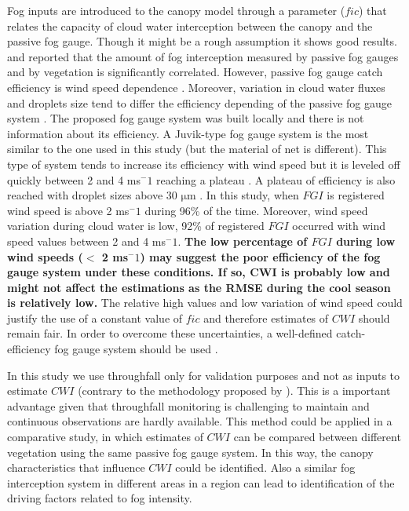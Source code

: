 \documentclass[a4paper,12pt]{article}
\begin{document}
\begin{linenumbers}
Fog inputs are introduced to the canopy model through a parameter ($fic$) that relates the capacity of cloud water interception between the canopy and the passive fog gauge. Though it might be a rough assumption it shows good results. \cite{Villegasetal2008} and \cite{Holwerdaetal2011} reported that the amount of fog interception measured by passive fog gauges and by vegetation is significantly correlated. However, passive fog gauge catch efficiency is wind speed dependence \citep{Frumauetal2011, Holwerdaetal2012}. Moreover, variation in cloud water fluxes and droplets size tend to differ the efficiency depending of the passive fog gauge system \citep{Frumauetal2011}. The proposed fog gauge system was built locally and there is not information about its efficiency. A Juvik-type fog gauge system \citep{Juvik1978} is the most similar to the one used in this study (but the material of net is different). This type of system tends to increase its efficiency with wind speed but it is leveled off quickly between 2 and 4 ms$^-1$ reaching a plateau \citep{Frumauetal2011}.  A plateau of efficiency is also reached with droplet sizes above 30 $\mathrm{\mu}$m \citep{Frumauetal2011}. In this study, when $FGI$ is registered wind speed is above 2 ms$^-1$ during 96\% of the time. Moreover, wind speed variation during cloud water is low, 92\% of registered $FGI$ occurred with wind speed values between 2 and 4 ms$^-1$. \textbf{The low percentage of $FGI$ during low wind speeds ($<$ 2 ms$^-1$) may suggest the poor efficiency of the fog gauge system under these conditions. If so, CWI is probably low and might not affect the estimations as the RMSE during the cool season is relatively low.} The relative high values and low variation of wind speed could justify the use of a constant value of $fic$ and therefore estimates of $CWI$ should remain fair. In order to overcome these uncertainties, a well-defined catch-efficiency fog gauge system should be used \citep{Holwerdaetal2011, Frumauetal2011}.

%

In this study we use throughfall only for validation purposes and not as inputs to estimate $CWI$ (contrary to the methodology proposed by \cite{Pryetetal2012a}). This is a important advantage given that throughfall monitoring is challenging to maintain and continuous observations are hardly available. This method could be applied in a comparative study, in which estimates of $CWI$ can be compared between different vegetation using the same passive fog gauge system. In this way, the canopy characteristics that influence $CWI$ could be identified. Also a similar fog interception system in different areas in a region can lead to identification of the driving factors related to fog intensity. 



\end{linenumbers}
\end{document}
